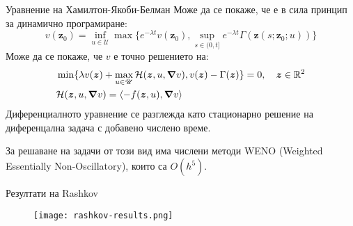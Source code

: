 \begin{frame}[t]{Уравнение на Хамилтон-Якоби-Белман}
  Може да се покаже, че е в сила принцип за динамично програмиране:
  \begin{equation}
    v(\boldsymbol{z}_0) = \inf_{u \in \mathscr{U}} \max\{e^{-\lambda t} v(\boldsymbol{z}_0), \sup_{s \in (0, t]} e^{-\lambda t} \Gamma(\boldsymbol{z}(s; \boldsymbol{z}_0; u))\}
  \end{equation}
  Може да се покаже, че $v$ е точно решението на:
  \begin{equation}
    \begin{split}
      &\min\{\lambda v(\boldsymbol{z}) + \max_{u \in \mathscr{U}} \mathcal{H}(\boldsymbol{z}, u, \grad{v}), v(\boldsymbol{z}) - \Gamma(\boldsymbol{z}) \} = 0, \quad \boldsymbol{z} \in \mathbb{R}^2 \\
      &\mathcal{H}(\boldsymbol{z}, u, \grad{v}) = \langle -f(\boldsymbol{z}, u), \grad{v} \rangle
    \end{split}
  \end{equation}
  Диференциалното уравнение се разглежда като стационарно решение на диференцална задача с добавено числено време.

  За решаване на задачи от този вид има числени методи WENO (Weighted Essentially Non-Oscillatory), които са $O(h^5)$.
\end{frame}

\begin{frame}[t]{Резултати на Rashkov}
  \begin{figure}
    \texttt{[image: rashkov-results.png]}
  \end{figure}
\end{frame}
